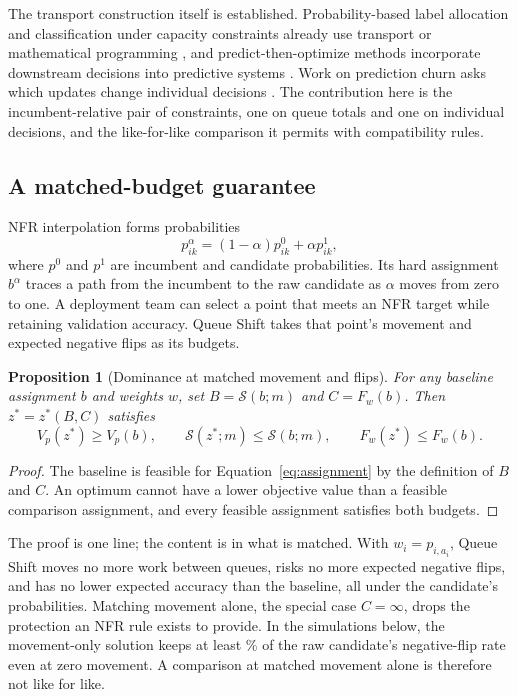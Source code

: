 \documentclass[11pt]{article}
\newtheorem{proposition}{Proposition}
\newcommand{\shift}{\mathcal{S}}
\newcommand{\valuefn}{V}
\begin{document}
The transport construction itself is established. Probability-based label allocation and
classification under capacity constraints already use transport or mathematical programming
\citep{tai2021sinkhorn,rabkin2024resource}, and predict-then-optimize methods incorporate
downstream decisions into predictive systems \citep{elmachtoub2022smart}. Work on prediction churn
asks which updates change individual decisions \citep{traeuble2021backward,watsondaniels2024churn}.
The contribution here is the incumbent-relative pair of constraints, one on queue totals and one
on individual decisions, and the like-for-like comparison it permits with compatibility rules.

\subsection{A matched-budget guarantee}

NFR interpolation forms probabilities
\[
  p^{\alpha}_{ik}=(1-\alpha)p^0_{ik}+\alpha p^1_{ik},
\]
where $p^0$ and $p^1$ are incumbent and candidate probabilities. Its hard assignment $b^\alpha$
traces a path from the incumbent to the raw candidate as $\alpha$ moves from zero to one. A
deployment team can select a point that meets an NFR target while retaining validation accuracy.
Queue Shift takes that point's movement and expected negative flips as its budgets.

\begin{proposition}[Dominance at matched movement and flips]
For any baseline assignment $b$ and weights $w$, set $B=\shift(b;m)$ and $C=F_w(b)$. Then
$z^*=z^*(B,C)$ satisfies
\[
  \valuefn_p(z^*)\geq \valuefn_p(b),\qquad \shift(z^*;m)\leq \shift(b;m),\qquad
  F_w(z^*)\leq F_w(b).
\]
\end{proposition}

\begin{proof}
The baseline is feasible for Equation~\ref{eq:assignment} by the definition of $B$ and $C$. An
optimum cannot have a lower objective value than a feasible comparison assignment, and every
feasible assignment satisfies both budgets.
\end{proof}

The proof is one line; the content is in what is matched. With $w_i=p_{i,a_i}$, Queue Shift moves
no more work between queues, risks no more expected negative flips, and has no lower expected
accuracy than the baseline, all under the candidate's probabilities. Matching movement alone, the
special case $C=\infty$, drops the protection an NFR rule exists to provide. In the simulations
below, the movement-only solution keeps at least \QSZeroNFRRawShareMin\% of the raw candidate's
negative-flip rate even at zero movement. A comparison at matched movement alone is therefore not
like for like.
\end{document}
